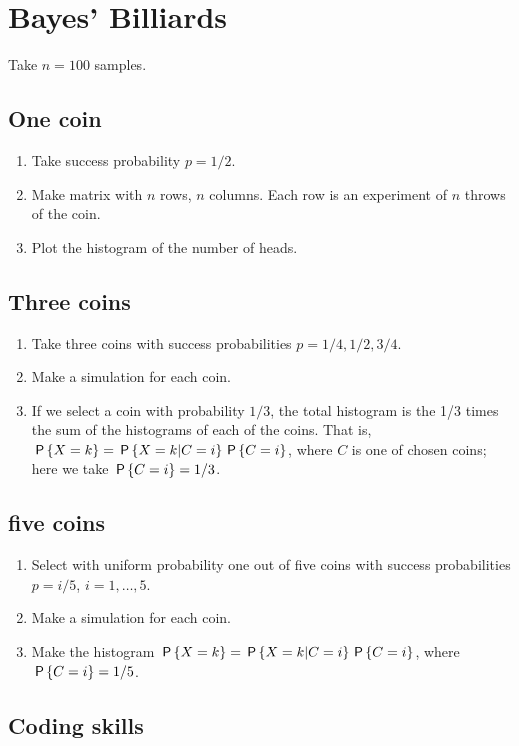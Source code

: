 \documentclass[assignments]{subfiles}
\begin{document}
\section{Bayes' Billiards}
\label{sec:orgf93559e}
Take \(n=100\) samples.

\subsection{One coin}
\label{sec:org1e9a031}
\begin{enumerate}
\item Take success probability \(p=1/2\).
\item Make matrix with \(n\) rows, \(n\) columns. Each row is an experiment of \(n\) throws of the coin.
\item Plot the histogram of the number of heads.
\end{enumerate}

\subsection{Three coins}
\label{sec:orga657159}
\begin{enumerate}
\item Take three coins with success probabilities \(p=1/4, 1/2, 3/4\).
\item Make a simulation for each coin.
\item If we select a coin with probability \(1/3\), the total histogram is the 1/3 times the sum of the histograms of each of the coins. That is, \(\P{X=k} = \P{X=k|C = i}\P{C=i}\), where \(C\) is one of chosen coins;  here we take \(\P{C=i} = 1/3\).
\end{enumerate}

\subsection{five coins}
\label{sec:orga1a3b28}
\begin{enumerate}
\item Select with uniform probability one out of five coins with success probabilities \(p=i/5\),  \(i=1,\ldots, 5\).
\item Make a simulation for each coin.
\item Make the histogram \(\P{X=k} = \P{X=k|C = i}\P{C=i}\), where \(\P{C=i} = 1/5\).
\end{enumerate}


\subsection{Coding skills}
\label{sec:coding-skills-1}
\end{document}
